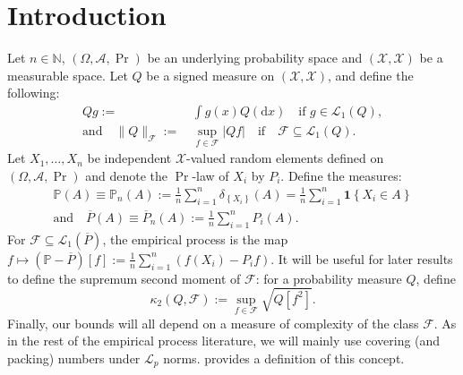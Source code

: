 
\section{Introduction}

Let \(n \in \mathbb{N}\), \((\Omega, \mathscr{A}, \Pr)\) be an underlying
probability space and \((\mathcal{X}, \mathscr{X})\) be a measurable space.
Let \(Q\) be a signed measure on \((\mathcal{X}, \mathscr{X})\),
and define the following:
\begin{equation*}
  \begin{split}
  Q g :=
  & \, \int g (x) Q (\mathrm{d} x) \quad \text{if } g \in \mathscr{L}_{1} (Q),
  \\
  \text{and} \quad \|Q\|_{\mathcal{F}} :=
  & \, \sup_{f \in \mathcal{F}} |Q f| \quad \text{if} \quad \mathcal{F} \subseteq
  \mathscr{L}_{1} (Q).
  \end{split}
\end{equation*}
Let \(X_{1}, \dots, X_{n}\) be independent \(\mathcal{X}\)-valued random
elements defined on \((\Omega, \mathscr{A}, \Pr)\) and denote the \(\Pr\)-law of
\(X_{i}\) by \(P_{i}\).
Define the measures:
\begin{equation*}
  \begin{gathered}
    \mathbb{P} (A) \equiv \mathbb{P}_{n} (A) := \frac{1}{n} \sum_{i = 1}^{n}
    \delta_{\left\{ X_{i} \right\}} (A) = \frac{1}{n} \sum_{i = 1}^{n}
    \mathbf{1} \left\{ X_{i} \in A \right\} \\
    \text{and} \quad \overline{P} (A) \equiv \overline{P}_{n} (A) := \frac{1}{n}
    \sum_{i = 1}^{n} P_{i} (A).
  \end{gathered}
\end{equation*}
For \(\mathcal{F} \subseteq \mathscr{L}_{1} (\overline{P})\),
the empirical process is the map
\(f \mapsto \left( \mathbb{P} - \overline{P} \right) [f] := \frac{1}{n} \sum_{i
= 1}^{n} \left( f \left( X_{i} \right) - P_{i} f \right)\).
It will be useful for later results to define the supremum second moment of
\(\mathcal{F}\): for a probability measure \(Q\), define
\begin{equation}
  \kappa_{2} (Q, \mathcal{F}) := \sup_{f \in \mathcal{F}} \sqrt{Q \left[
  f^{2} \right]}.
  \label{eqn--F-2nd-moment-max}
\end{equation}
Finally, our bounds will all depend on a measure of complexity of the class
\(\mathcal{F}\).
As in the rest of the empirical process literature, we will mainly use
covering (and packing) numbers under \(\mathscr{L}_{p}\) norms.
 provides a definition of this concept.

